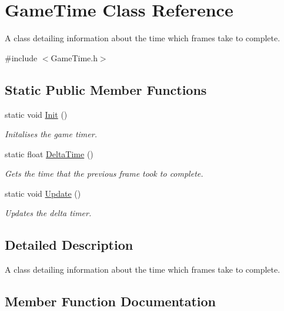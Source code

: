 \hypertarget{class_game_time}{}\section{Game\+Time Class Reference}
\label{class_game_time}


A class detailing information about the time which frames take to complete.  




{\ttfamily \#include $<$Game\+Time.\+h$>$}

\subsection*{Static Public Member Functions}
\begin{DoxyCompactItemize}
\item 
static void \hyperlink{class_game_time_a1f310e807ddb53d1a1278c4a0a2785ed}{Init} ()
\begin{DoxyCompactList}\small\item\em Initalises the game timer. \end{DoxyCompactList}\item 
static float \hyperlink{class_game_time_a49de1938f0810dc7ba3eaea27211a95d}{Delta\+Time} ()
\begin{DoxyCompactList}\small\item\em Gets the time that the previous frame took to complete. \end{DoxyCompactList}\item 
static void \hyperlink{class_game_time_a2d9927ce7e6cf48da7e8b48a4f1b917f}{Update} ()
\begin{DoxyCompactList}\small\item\em Updates the delta timer. \end{DoxyCompactList}\end{DoxyCompactItemize}


\subsection{Detailed Description}
A class detailing information about the time which frames take to complete. 



\subsection{Member Function Documentation}
\mbox{\label{class_game_time_a49de1938f0810dc7ba3eaea27211a95d}} 
